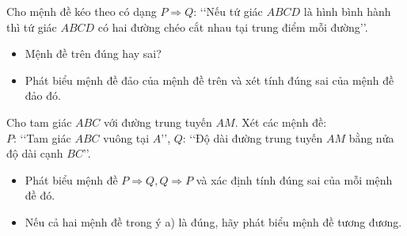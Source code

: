 \begin{bt}%
	Cho mệnh đề kéo theo có dạng $P \Rightarrow Q$: \lq\lq Nếu tứ giác $ABCD$ là hình bình hành thì tứ giác $ABCD$ có hai đường chéo cắt nhau tại trung điểm mỗi đường\rq\rq.
	\begin{itemize}
		\item[a)] Mệnh đề trên đúng hay sai?
		\item[b)] Phát biểu mệnh đề đảo của mệnh đề trên và xét tính đúng sai của mệnh đề đảo đó.
	\end{itemize}
\end{bt}

\begin{bt}%
	Cho tam giác $ABC$ với đường trung tuyến $AM$. Xét các mệnh đề:\\
	$P$: \lq\lq Tam giác $ABC$ vuông tại $A$\rq\rq,
	$Q$: \lq\lq Độ dài đường trung tuyến $AM$ bằng nửa độ dài cạnh $BC$\rq\rq.
	\begin{itemize}
		\item[a)] Phát biểu mệnh đề $P \Rightarrow Q, Q \Rightarrow P$ và xác định tính đúng sai của mỗi mệnh đề đó.
		\item[b)] Nếu cả hai mệnh đề trong ý a) là đúng, hãy phát biểu mệnh đề tương đương.
	\end{itemize}
\end{bt}

